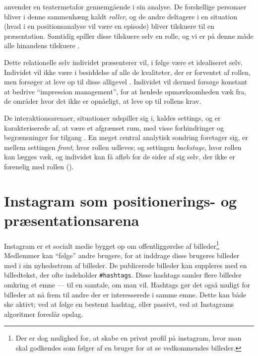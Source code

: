 \citeauthor{goffmanPresentationSelfEveryday1956} anvender en 
teatermetafor gennemgående i sin analyse. De forskellige personaer 
bliver i denne sammenhæng kaldt \emph{roller}, og de andre 
deltagere i en situation (hvad i en positionsanalyse vil være en 
episode) bliver tilskuere til en præsentation. Samtidig spiller 
disse tilskuere selv en rolle, og vi er på denne måde alle 
hinandens tilskuere \autocite[s. 
???]{goffmanPresentationSelfEveryday1956}.

Dette relationelle selv individet præsenterer vil, i følge 
\citeauthor{goffmanPresentationSelfEveryday1956} være et 
idealiseret selv. Individet vil ikke være i besiddelse af alle de 
kvaliteter, der er forventet af rollen, men forsøger at leve op 
til disse alligevel \citeyear[s. 
???]{goffmanPresentationSelfEveryday1956}. Individet vil dermed 
forsøge konstant at bedrive “impression management”, for at 
henlede opmærksomheden væk fra, de områder hvor det ikke er 
opnåeligt, at leve op til rollens krav.

De interaktionsarenaer, situationer udspiller sig i, kaldes 
settings, og er karakteriserede af, at være et afgrænset rum, med 
visse forhindringer og begrænsninger for tilgang \autocite[s.  
???]{goffmanPresentationSelfEveryday1956}. En meget central 
analytisk sondring 
\citeauthor{goffmanPresentationSelfEveryday1956} foretager sig, er
mellem settingen \emph{front}, hvor rollen udleves; og settingen 
\emph{backstage}, hvor rollen kan lægges væk, og individet kan få 
afløb for de sider af sig selv, der ikke er forenelig med rollen 
(\citeyear[s. ???]{goffmanPresentationSelfEveryday1956}).

\section{Instagram som positionerings- og præsentationsarena}
Instagram er et socialt medie bygget op om offentliggørelse af 
billeder\footnote{Der er dog mulighed for, at skabe en privat 
profil på instagram, hvor man skal godkendes som følger af en 
bruger for at se vedkommendes billeder.} Medlemmer kan “følge” 
andre brugere, for at inddrage disse brugeres billeder med i sin 
nyhedsstrøm af billeder. De publicerede billeder kan suppleres med 
en billedtekst, der ofte indeholder \texttt{\#hashtags}. Disse 
hashtags samler flere billeder omkring et emne — til en samtale, 
om man vil. Hashtags gør det også muligt for billeder at nå frem 
til andre der er interesserede i samme emne. Dette kan både ske 
aktivt; ved at følge en bestemt hashtag, eller passivt, ved at 
Instagrams algoritmer foreslår opslag.

